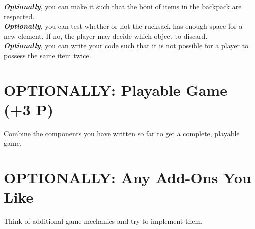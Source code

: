 \documentclass[
	english,
	fontsize=10pt,
	parskip=half,
	titlepage=true,
	DIV=12
]{scrartcl}
\begin{document}
\textbf{\emph{Optionally}}, you can make it such that the boni of items in the backpack are respected.\\
\textbf{\emph{Optionally}}, you can test whether or not the rucksack has enough space for a new element. If no, the player may decide which object to discard.\\
\textbf{\emph{Optionally}}, you can write your code such that it is not possible for a player to possess the same item twice.

\section{OPTIONALLY: Playable Game (+3 P)}
Combine the components you have written so far to get a complete, playable game.

\section{OPTIONALLY: Any Add-Ons You Like}
Think of additional game mechanics and try to implement them.

\end{document}
